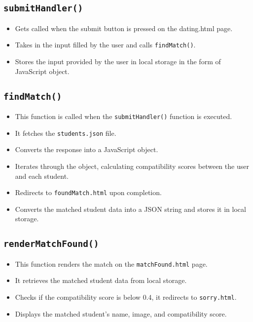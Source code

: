 \documentclass[12pt,a4paper]{article}
\begin{document}
\subsection{\texttt{submitHandler()}}
\begin{itemize}
    \item Gets called when the submit button is pressed on the dating.html page.
    \item Takes in the input filled by the user and calls \texttt{findMatch()}.
    \item Stores the input provided by the user in local storage in the form of JavaScript object. 
\end{itemize}

\subsection{\texttt{findMatch()}}
\begin{itemize}
    \item This function is called when the \texttt{submitHandler()} function is executed.
    \item It fetches the \texttt{students.json} file.
    \item Converts the response into a JavaScript object.
    \item Iterates through the object, calculating compatibility scores between the user and each student.
    \item Redirects to \texttt{foundMatch.html} upon completion.
    \item Converts the matched student data into a JSON string and stores it in local storage.
\end{itemize}

\subsection{\texttt{renderMatchFound()}}
\begin{itemize}
    \item This function renders the match on the \texttt{matchFound.html} page.
    \item It retrieves the matched student data from local storage.
    \item Checks if the compatibility score is below 0.4, it redirects to \texttt{sorry.html}.
    \item Displays the matched student's name, image, and compatibility score.
\end{itemize}
\end{document}
